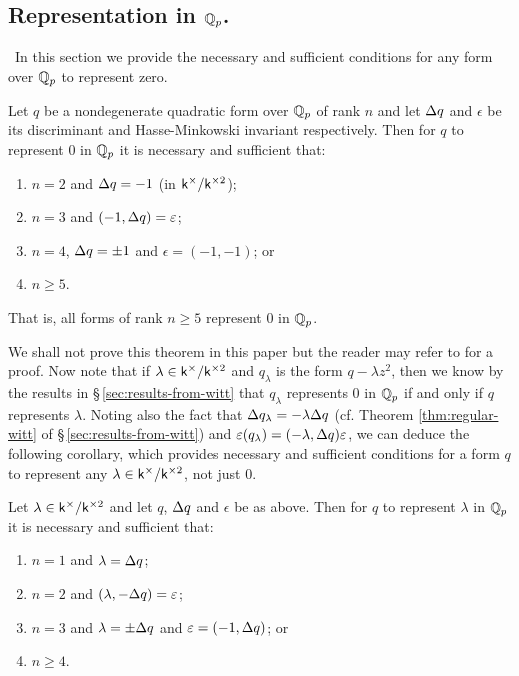 \subsection{Representation in \(\mathbb{Q}_p\).}~In this section we provide the necessary and sufficient conditions for any form over \(\mathbb{Q}_p\) to represent zero.\label{sec:representation-in-qp-sec}

\begin{theoremx}\label{thm:rep-in-rationals-p}
    Let \(q\) be a nondegenerate quadratic form over \(\mathbb{Q}_p\) of rank \(n\) and let \({\Delta} q\) and \(\epsilon\) be its discriminant and Hasse-Minkowski invariant respectively. Then for \(q\) to represent \(0\) in \(\mathbb{Q}_p\) it is necessary and sufficient that:

    \smallskip

    \begin{enumerate}[nosep, label=(\alph*)]
        \item \(n = 2\) and \({\Delta} q = -1\) (in \(\mathsf{k}^{\times}/\mathsf{k}^{\times2}\));
        \item \(n = 3\) and \((-1, {\Delta} q) = \varepsilon\);
        \item \(n = 4\), \({\Delta} q = \pm 1\) and \(\epsilon = (-1, -1)\); or
        \item \(n \geq 5\).
    \end{enumerate}
    That is, all forms of rank \(n \geq 5\) represent \(0\) in \(\mathbb{Q}_p\).
\end{theoremx}

We shall not prove this theorem in this paper but the reader may refer to \cite[pp.~36--39]{serre2012course} for a proof. Now note that if \(\lambda \in \mathsf{k}^{\times}/\mathsf{k}^{\times2}\) and \(q_{\lambda}\) is the form \(q - \lambda z^2\), then we know by the results in \S\,\ref{sec:results-from-witt} that \(q_{\lambda}\) represents \(0\) in \(\mathbb{Q}_p\) if and only if \(q\) represents \(\lambda\). Noting also the fact that \({\Delta} q_{\lambda} = -\lambda {\Delta} q\) (cf. Theorem \ref{thm:regular-witt} of \S\,\ref{sec:results-from-witt}) and \(\varepsilon(q_\lambda) = (-\lambda, {\Delta} q)\varepsilon\), we can deduce the following corollary, which provides necessary and sufficient conditions for a form \(q\) to represent any \(\lambda \in \mathsf{k}^{\times}/\mathsf{k}^{\times2}\), not just \(0\).

\begin{corollary}
    Let \(\lambda \in \mathsf{k}^{\times}/\mathsf{k}^{\times2}\) and let \(q\), \({\Delta} q\) and \(\epsilon\) be as above. Then for \(q\) to represent \(\lambda\) in \(\mathbb{Q}_p\) it is necessary and sufficient that:

    \smallskip

    \begin{enumerate}[nosep, label=(\alph*)]
        \item \(n = 1\) and \(\lambda = {\Delta} q\);
        \item \(n = 2\) and \((\lambda, -{\Delta} q) = \varepsilon\);
        \item \(n = 3\) and \(\lambda = \pm {\Delta} q\) and \(\varepsilon = (-1, {\Delta} q)\); or
        \item \(n \geq 4\).
    \end{enumerate}
\end{corollary}

